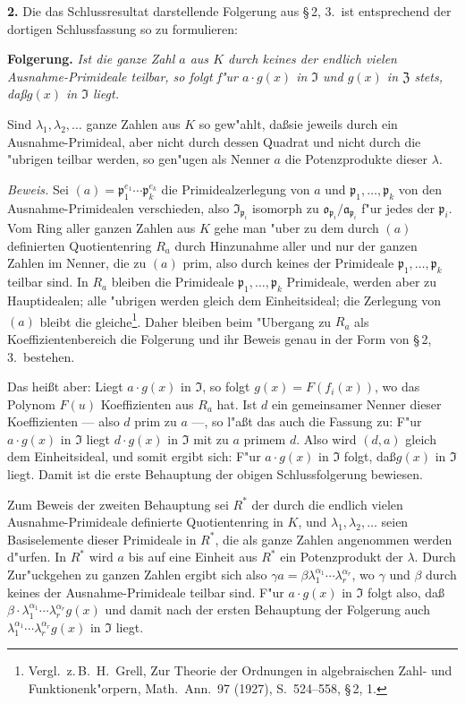 \documentclass[12pt,a4paper]{article}
\theoremstyle{plain}
\begin{document}
\medskip\noindent\textbf{2.}
Die das Schlussresultat darstellende Folgerung aus \S\,2, 3.\ ist entsprechend der dortigen Schlussfassung so zu formulieren:

\noindent\textbf{Folgerung.}
\textit{Ist die ganze Zahl $a$ aus $K$ durch keines der endlich vielen Ausnahme-Primideale teilbar, so folgt f"ur $a \cdot g(x)$ in $\mathfrak{I}$ und $g(x)$ in $\mathfrak{Z}$ stets, da\ss $g(x)$ in $\mathfrak{I}$ liegt.}

Sind $\lambda_1,\lambda_2,\ldots$ ganze Zahlen aus $K$ so gew"ahlt, da\ss sie jeweils durch ein Ausnahme-Primideal, aber nicht durch dessen Quadrat und nicht durch die "ubrigen teilbar werden, so gen"ugen als Nenner $a$ die Potenzprodukte dieser $\lambda$.

\noindent\textit{Beweis.}
Sei $(a) = \mathfrak{p}_1^{e_1} \cdots \mathfrak{p}_k^{e_k}$ die Primidealzerlegung von $a$ und $\mathfrak{p}_1,\ldots,\mathfrak{p}_k$ von den Ausnahme-Primidealen verschieden, also $\mathfrak{I}_{\mathfrak{p}_i}$ isomorph zu $\mathfrak{o}_{\mathfrak{p}_i}/\mathfrak{a}_{\mathfrak{p}_i}$ f"ur jedes der $\mathfrak{p}_i$. Vom Ring aller ganzen Zahlen aus $K$ gehe man "uber zu dem durch $(a)$ definierten Quotientenring $R_a$ durch Hinzunahme aller und nur der ganzen Zahlen im Nenner, die zu $(a)$ prim, also durch keines der Primideale $\mathfrak{p}_1,\ldots,\mathfrak{p}_k$ teilbar sind. In $R_a$ bleiben die Primideale $\mathfrak{p}_1,\ldots,\mathfrak{p}_k$ Primideale, werden aber zu Hauptidealen; alle "ubrigen werden gleich dem Einheitsideal; die Zerlegung von $(a)$ bleibt die gleiche\footnote{Vergl.\ z.\,B.\ H.\ Grell, Zur Theorie der Ordnungen in algebraischen Zahl- und Funktionenk"orpern, Math.\ Ann.\ 97 (1927), S.\ 524--558, \S\,2, 1.}. Daher bleiben beim "Ubergang zu $R_a$ als Koeffizientenbereich die Folgerung und ihr Beweis genau in der Form von \S\,2, 3.\ bestehen.

Das hei\ss t aber: Liegt $a \cdot g(x)$ in $\mathfrak{I}$, so folgt $g(x) = F(f_i(x))$, wo das Polynom $F(u)$ Koeffizienten aus $R_a$ hat. Ist $d$ ein gemeinsamer Nenner dieser Koeffizienten --- also $d$ prim zu $a$ ---, so l"a\ss t das auch die Fassung zu: F"ur $a \cdot g(x)$ in $\mathfrak{I}$ liegt $d \cdot g(x)$ in $\mathfrak{I}$ mit zu $a$ primem $d$. Also wird $(d, a)$ gleich dem Einheitsideal, und somit ergibt sich: F"ur $a \cdot g(x)$ in $\mathfrak{I}$ folgt, da\ss $g(x)$ in $\mathfrak{I}$ liegt. Damit ist die erste Behauptung der obigen Schlussfolgerung bewiesen.

Zum Beweis der zweiten Behauptung sei $R^*$ der durch die endlich vielen Ausnahme-Primideale definierte Quotientenring in $K$, und $\lambda_1,\lambda_2,\ldots$ seien Basiselemente dieser Primideale in $R^*$, die als ganze Zahlen angenommen werden d"urfen. In $R^*$ wird $a$ bis auf eine Einheit aus $R^*$ ein Potenzprodukt der $\lambda$. Durch Zur"uckgehen zu ganzen Zahlen ergibt sich also $\gamma a = \beta \lambda_1^{\alpha_1} \cdots \lambda_r^{\alpha_r}$, wo $\gamma$ und $\beta$ durch keines der Ausnahme-Primideale teilbar sind. F"ur $a \cdot g(x)$ in $\mathfrak{I}$ folgt also, da\ss $\beta \cdot \lambda_1^{\alpha_1} \cdots \lambda_r^{\alpha_r} g(x)$ und damit nach der ersten Behauptung der Folgerung auch $\lambda_1^{\alpha_1} \cdots \lambda_r^{\alpha_r} g(x)$ in $\mathfrak{I}$ liegt.
\end{document}
